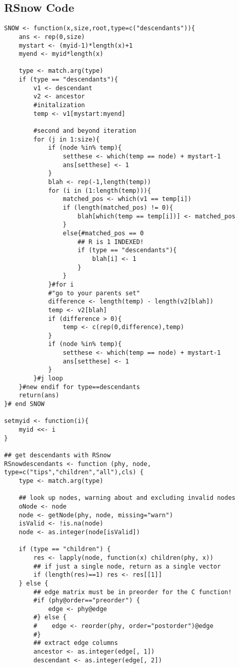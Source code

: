 \documentclass[11pt,letterpaper]{article}
\begin{document}
\subsection{RSnow Code}
\begin{lstlisting}[style=MyR]
SNOW <- function(x,size,root,type=c("descendants")){
    ans <- rep(0,size)
    mystart <- (myid-1)*length(x)+1
    myend <- myid*length(x)

    type <- match.arg(type)
    if (type == "descendants"){
        v1 <- descendant
        v2 <- ancestor
        #initalization
        temp <- v1[mystart:myend]

        #second and beyond iteration
        for (j in 1:size){
            if (node %in% temp){
                setthese <- which(temp == node) + mystart-1
                ans[setthese] <- 1
            }
            blah <- rep(-1,length(temp))
            for (i in (1:length(temp))){
                matched_pos <- which(v1 == temp[i])
                if (length(matched_pos) != 0){
                    blah[which(temp == temp[i])] <- matched_pos
                }
                else{#matched_pos == 0
                    ## R is 1 INDEXED!
                    if (type == "descendants"){
                        blah[i] <- 1
                    }
                }
            }#for i 
            #"go to your parents set"
            difference <- length(temp) - length(v2[blah])
            temp <- v2[blah]
            if (difference > 0){
                temp <- c(rep(0,difference),temp)
            }
            if (node %in% temp){
                setthese <- which(temp == node) + mystart-1
                ans[setthese] <- 1
            }
        }#j loop
    }#new endif for type==descendants
    return(ans)
}# end SNOW

setmyid <- function(i){
    myid <<- i
}

## get descendants with RSnow
RSnowdescendants <- function (phy, node, type=c("tips","children","all"),cls) {
    type <- match.arg(type)

    ## look up nodes, warning about and excluding invalid nodes
    oNode <- node
    node <- getNode(phy, node, missing="warn")
    isValid <- !is.na(node)
    node <- as.integer(node[isValid])

    if (type == "children") {
        res <- lapply(node, function(x) children(phy, x))
        ## if just a single node, return as a single vector
        if (length(res)==1) res <- res[[1]]
    } else {
        ## edge matrix must be in preorder for the C function!
        #if (phy@order=="preorder") {
            edge <- phy@edge
        #} else {
        #    edge <- reorder(phy, order="postorder")@edge
        #}
        ## extract edge columns
        ancestor <- as.integer(edge[, 1])
        descendant <- as.integer(edge[, 2])


\end{lstlisting}
\end{document}
